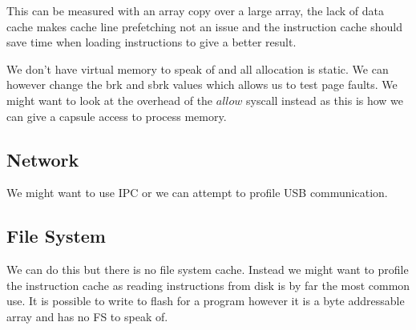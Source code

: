 \documentclass{article}
\begin{document}
This can be measured with an array copy over a large array, the lack of data cache makes cache line prefetching not an issue and the instruction cache should save time when loading instructions to give a better result.

We don't have virtual memory to speak of and all allocation is static. We can however change the brk and sbrk values which allows us to test page faults. We might want to look at the overhead of the $allow$ syscall instead as this is how we can give a capsule access to process memory.

\subsection{Network}


We might want to use IPC or we can attempt to profile USB communication.

\subsection{File System}
We can do this but there is no file system cache. Instead we might want to profile the instruction cache as reading instructions from disk is by far the most common use. It is possible to write to flash for a program however it is a byte addressable array and has no FS to speak of.
\end{document}
